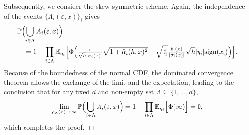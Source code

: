 \documentclass[11pt]{article}
\begin{document}
Subsequently, we consider the skew-symmetric scheme. Again, the independence of the events $\{A_i (\varepsilon, x)\}_i$ gives 
% 
\begin{align*}
& \mathbb{P} \Bigl( \bigcup_{i \in \Lambda} A_i (\varepsilon, x) \Bigr) \\ 
& \quad = 1 - \prod_{i \in \Lambda} \mathbb{E}_{\eta_i} 
\Bigl[ \Phi \Bigl(\tfrac{\varepsilon}{\sqrt{h} |\sigma_i (x)|} \sqrt{1 + \tilde{\alpha}_i (h, x)^2} - \sqrt{\tfrac{\pi}{2}} \tfrac{b_i (x)}{|\sigma_i (x)|} \sqrt{h} | \eta_i | \mathrm{sign} (x_i) \Bigr) \Bigr]. 
\end{align*}
% 
Because of the boundedness of the normal CDF, the dominated convergence theorem allows the exchange of the limit and the expectation, leading to the conclusion that for any fixed $d$ and non-empty set $\Lambda \subseteq \{1, \ldots, d\}$,  
% 
\begin{align}
\lim_{\rho_\Lambda (x)  \to \infty} 
\mathbb{P} \Bigl( \bigcup_{i \in \Lambda} A_i (\varepsilon, x) \Bigr) = 1 - \prod_{i \in \Lambda} \mathbb{E}_{\eta_i} \Bigl[ \Phi (\infty)  \Bigr] = 0, 
\end{align} 
% 
which completes the proof. $\Box$
\end{document}
